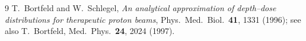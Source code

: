 \documentclass[11pt]{article}
\begin{document}
\begin{thebibliography}{9}
 T.~Bortfeld and W.~Schlegel,
\emph{An analytical approximation of depth--dose distributions for therapeutic
proton beams}, Phys.\ Med.\ Biol.\ \textbf{41}, 1331 (1996); see also
T.~Bortfeld, Med.\ Phys.\ \textbf{24}, 2024 (1997).
\end{thebibliography}
\end{document}
